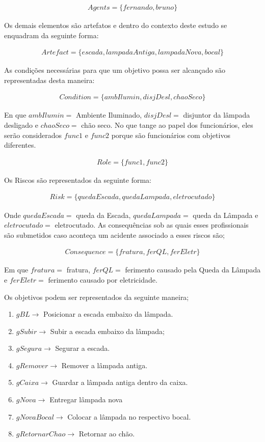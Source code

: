 \begin{eqnarray}\label{agentesintrodutorycase} \nonumber
	Agents = \{ fernando, bruno \}
\end{eqnarray}

Os demais elementos são artefatos e dentro do contexto deste estudo se enquadram da seguinte forma:

\begin{eqnarray}
	Artefact = \{ escada, lampadaAntiga, lampadaNova, bocal \} \nonumber
\end{eqnarray}

As condições necessárias para que um objetivo possa ser alcançado são representadas desta maneira: 

\begin{eqnarray}
	Condition = \{ ambIlumin, disjDesl, chaoSeco \} \nonumber
\end{eqnarray}

En que $ambIlumin =$ Ambiente Iluminado, $disjDesl = $ disjuntor da lâmpada desligado e $chaoSeco = $ chão seco. No que tange ao papel dos funcionários, eles serão considerados $func1$ e $func2$ porque são funcionários com objetivos diferentes. 

\begin{eqnarray}
	Role = \{ func1,func2 \}
\end{eqnarray}

Os Riscos são representados da seguinte forma: 

\begin{eqnarray}
	Risk = \{ quedaEscada, quedaLampada, eletrocutado \}
\end{eqnarray}

Onde $quedaEscada =$ queda da Escada, $quedaLampada =$ queda da Lâmpada e $eletrocutado =$ eletrocutado. As consequências sob as quais esses profissionais são submetidos caso aconteça um acidente associado a esses riscos são;

\begin{eqnarray}
	Consequence = \{fratura,ferQL, ferEletr\}
\end{eqnarray}

Em que $fratura =$ fratura, $ferQL =$ ferimento causado pela Queda da Lâmpada e $ferEletr =$ ferimento causado por eletricidade.

Os objetivos podem ser representados da seguinte maneira; 

\begin{enumerate}
	\item $gBL \to $ Posicionar a escada embaixo da lâmpada.
	\item $gSubir \to $ Subir a escada embaixo da lâmpada;
	\item $gSegura \to $ Segurar a escada. 
	\item $gRemover \to $ Remover a lâmpada antiga.
	\item $gCaixa \to $ Guardar a lâmpada antiga dentro da caixa.
	\item $gNova \to $ Entregar lâmpada nova
	\item $gNovaBocal \to$ Colocar a lâmpada no respectivo bocal.
	\item $gRetornarChao \to$ Retornar ao chão.
\end{enumerate}

